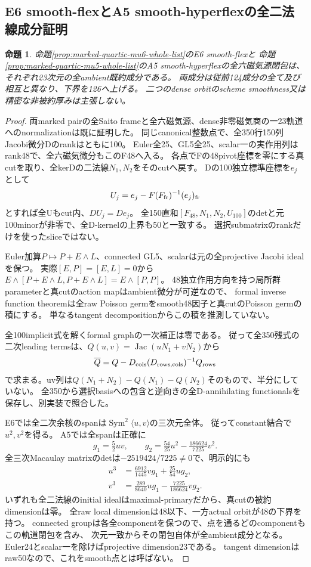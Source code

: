 \documentclass[a4paper,11pt]{ltjsarticle}
\newtheorem{proposition}{命題}[section]
\theoremstyle{definition}
\begin{document}
\subsection{E6 smooth-flexとA5 smooth-hyperflexの全二法線成分証明}
\begin{proposition}\label{prop:marked-quartic-two-normal-components}
命題\ref{prop:marked-quartic-mu6-whole-list}のE6 smooth-flexと
命題\ref{prop:marked-quartic-mu5-whole-list}のA5 smooth-hyperflexの全六磁気源閉包は、
それぞれ23次元の全ambient既約成分である。
両成分は従前124成分の全て及び相互と異なり、下界を126へ上げる。
二つのdense orbitのscheme smoothness又は精密な非被約厚みは主張しない。
\end{proposition}
\begin{proof}
両marked pairの全Saito frameと全六磁気源、dense非零磁気商の一23軌道へのnormalizationは既に証明した。
同じcanonical整数点で、全350行150列Jacobi微分Dのrankはともに100。
Euler全25、GL5全25、scalar一の実作用列はrank48で、全六磁気微分もこのF48へ入る。
各点でFの48pivot座標を零にする真cutを取り、全kerDの二法線$N_1,N_2$をそのcutへ戻す。
Dの100独立標準座標を$e_j$として
\[
 U_j=e_j-F(F_{\rm fr})^{-1}(e_j)_{\rm fr}
\]
とすれば全Uもcut内、$DU_j=De_j$。
全150直和$[F_{48},N_1,N_2,U_{100}]$のdetと元100minorが非零で、全D-kernelの上界も50と一致する。
選択submatrixのrankだけを使ったsliceではない。

Euler加算$P\mapsto P+E\wedge L$、connected GL5、scalarは元の全projective Jacobi idealを保つ。
実際$[E,P]=[E,L]=0$から
$E\wedge[P+E\wedge L,P+E\wedge L]=E\wedge[P,P]$。
48独立作用方向を持つ局所群parameterと真cutのaction mapはambient微分が可逆なので、
formal inverse function theoremは全raw Poisson germをsmooth48因子と真cutのPoisson germの積にする。
単なるtangent decompositionからこの積を推測していない。

全100implicit式を解くformal graphの一次補正は零である。
従って全350残式の二次leading termsは、$Q(u,v)=\operatorname{Jac}(uN_1+vN_2)$から
\[
 \overline Q=Q-D_{\rm cols}(D_{{\rm rows},{\rm cols}})^{-1}Q_{\rm rows}
\]
で求まる。uv列は$Q(N_1+N_2)-Q(N_1)-Q(N_2)$そのもので、半分にしていない。
全350から選択basisへの包含と逆向きの全D-annihilating functionalsを保存し、別実装で照合した。

E6では全二次余核のspanは$\operatorname{Sym}^2\langle u,v\rangle$の三次元全体。
従ってconstant結合で$u^2,v^2$を得る。
A5では全spanは正確に
\[
 g_1=\tfrac52uv,\qquad
 g_2=\tfrac{54}{25}u^2-\tfrac{186624}{7225}v^2.
\]
全三次Macaulay matrixのdetは$-2519424/7225\ne0$で、明示的にも
\[
 \begin{split}
 u^3&=\tfrac{6912}{1445}vg_1+\tfrac{25}{54}ug_2,\\
 v^3&=\tfrac{289}{8640}ug_1-\tfrac{7225}{186624}vg_2.
 \end{split}
\]
いずれも全二法線のinitial idealはmaximal-primaryだから、真cutの被約dimensionは零。
全raw local dimensionは48以下、一方actual orbitが48の下界を持つ。
connected groupは各全componentを保つので、点を通るどのcomponentもこの軌道閉包を含み、
次元一致からその閉包自体が全ambient成分となる。
Euler24とscalar一を除けばprojective dimension23である。
tangent dimensionはraw50なので、これをsmooth点とは呼ばない。


\end{proof}
\end{document}

